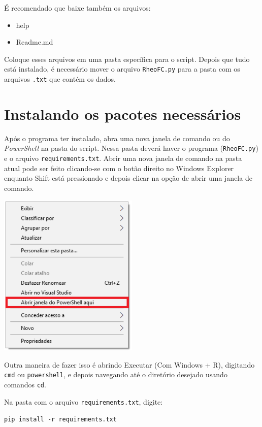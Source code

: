 \documentclass[a4paper, 12pt]{article}
\begin{document}
É recomendado que baixe também os arquivos:

\begin{itemize}
\item help
\item Readme.md
\end{itemize}

Coloque esses arquivos em uma pasta específica para o script. Depois que tudo está instalado, é necessário mover o arquivo \texttt{RheoFC.py} para a pasta com os arquivos \texttt{.txt} que contém os dados.

\section{Instalando os pacotes necessários}

Após o programa ter instalado, abra uma nova janela de comando ou do \emph{PowerShell} na pasta do script. Nessa pasta deverá haver o programa (\texttt{RheoFC.py}) e o arquivo \texttt{requirements.txt}. Abrir uma nova janela de comando na pasta atual pode ser feito clicando-se com o botão direito no Windows Explorer enquanto Shift está pressionado e depois clicar na opção de abrir uma janela de comando.

\begin{center}
\includegraphics[width = 0.5\textwidth]{PowerShell}
\end{center}

Outra maneira de fazer isso é abrindo Executar (Com Windows + R), digitando \texttt{cmd} ou \texttt{powershell}, e depois navegando até o diretório desejado usando comandos \texttt{cd}.

Na pasta com o arquivo \texttt{requirements.txt}, digite:

\texttt{pip install -r requirements.txt}
\end{document}
